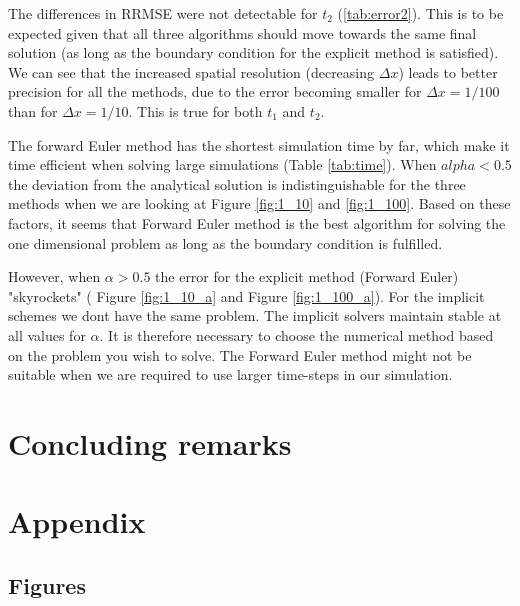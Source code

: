\documentclass{article}
\begin{document}
\begin{multicols}{2}
The differences in RRMSE were not detectable for $t_2$ (\ref{tab:error2}). This is to be expected given that all three algorithms should move towards the same final solution (as long as the boundary condition for the explicit method is satisfied). We can see that the increased spatial resolution (decreasing $\Delta x$) leads to better precision for all the methods, due to the error becoming smaller for $\Delta x=1/100$ than for $\Delta x = 1/10$. This is true for both $t_1$ and $t_2$. 

The forward Euler method has the shortest simulation time by far, which make it time efficient when solving large simulations (Table \ref{tab:time}). When $alpha<0.5$ the deviation from the analytical solution is indistinguishable for the three methods when we are looking at Figure \ref{fig:1_10} and \ref{fig:1_100}. Based on these factors, it seems that Forward Euler method is the best algorithm for solving the one dimensional problem as long as the boundary condition is fulfilled. 

However, when $\alpha>0.5$ the error for the explicit method (Forward Euler) "skyrockets" ( Figure \ref{fig:1_10_a} and Figure \ref{fig:1_100_a}). For the implicit schemes we dont have the same problem. The implicit solvers maintain stable at all values for $\alpha$. It is therefore necessary to choose the numerical method based on the problem you wish to solve. The Forward Euler method might not be suitable when we are required to use larger time-steps in our simulation. 



\section{Concluding remarks}




\end{multicols}

\clearpage

\appendix %

\section{Appendix}

\subsection{Figures}
\end{document}
